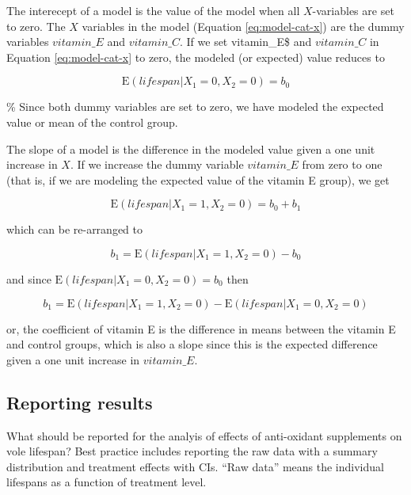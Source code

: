 \documentclass[]{book}
\begin{document}
The interecept of a model is the value of the model when all
\(X\)-variables are set to zero. The \(X\) variables in the model
(Equation \eqref{eq:model-cat-x}) are the dummy variables \(vitamin\_E\)
and \(vitamin\_C\). If we set vitamin\_E\$ and \(vitamin\_C\) in
Equation \eqref{eq:model-cat-x} to zero, the modeled (or expected) value
reduces to

\begin{equation}
\mathrm{E}(lifespan|X_1=0, X_2=0) = b_0
\end{equation}

\% Since both dummy variables are set to zero, we have modeled the
expected value or mean of the control group.

The slope of a model is the difference in the modeled value given a one
unit increase in \(X\). If we increase the dummy variable \(vitamin\_E\)
from zero to one (that is, if we are modeling the expected value of the
vitamin E group), we get

\begin{equation}
\mathrm{E}(lifespan|X_1=1, X_2=0) = b_0 + b_1
\end{equation}

which can be re-arranged to

\begin{equation}
b_1 = \mathrm{E}(lifespan|X_1=1, X_2=0) - b_0
\end{equation}

and since \(\mathrm{E}(lifespan|X_1=0, X_2=0) = b_0\) then

\begin{equation}
b_1 = \mathrm{E}(lifespan|X_1=1, X_2=0) - \mathrm{E}(lifespan|X_1=0, X_2=0)
\end{equation}

or, the coefficient of vitamin E is the difference in means between the
vitamin E and control groups, which is also a slope since this is the
expected difference given a one unit increase in \(vitamin\_E\).

\subsection{Reporting results}\label{reporting-results-1}

What should be reported for the analyis of effects of anti-oxidant
supplements on vole lifespan? Best practice includes reporting the raw
data with a summary distribution and treatment effects with CIs. ``Raw
data'' means the individual lifespans as a function of treatment level.
\end{document}
